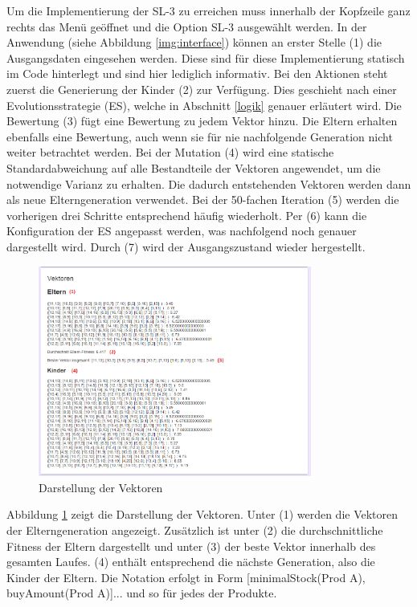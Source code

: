\documentclass[]{scrartcl}
\begin{document}
Um die Implementierung der SL-3 zu erreichen muss innerhalb der Kopfzeile ganz rechts das Menü geöffnet und die Option SL-3 ausgewählt werden. In der Anwendung (siehe Abbildung \ref{img:interface}) können an erster Stelle (1) die Ausgangsdaten eingesehen werden. Diese sind für diese Implementierung statisch im Code hinterlegt und sind hier lediglich informativ. Bei den Aktionen steht zuerst die Generierung der Kinder (2) zur Verfügung. Dies geschieht nach einer Evolutionsstrategie (ES), welche in Abschnitt \ref{logik} genauer erläutert wird. Die Bewertung (3) fügt eine Bewertung zu jedem Vektor hinzu. Die Eltern erhalten ebenfalls eine Bewertung, auch wenn sie für nie nachfolgende Generation nicht weiter betrachtet werden. Bei der Mutation (4) wird eine statische Standardabweichung auf alle Bestandteile der Vektoren angewendet, um die notwendige Varianz zu erhalten. Die dadurch entstehenden Vektoren werden dann als neue Elterngeneration verwendet. Bei der 50-fachen Iteration (5) werden die vorherigen drei Schritte entsprechend häufig wiederholt. Per (6) kann die Konfiguration der ES angepasst werden, was nachfolgend noch genauer dargestellt wird. Durch (7) wird der Ausgangszustand wieder hergestellt.\\

\begin{figure}[htbp]
	\centering
	\includegraphics[width=0.8\textwidth]{res/vektoren.png}
	\caption{Darstellung der Vektoren}
	\label{img:vektoren}
\end{figure}

Abbildung \ref{img:vektoren} zeigt die Darstellung der Vektoren. Unter (1) werden die Vektoren der Elterngeneration angezeigt. Zusätzlich ist unter (2) die durchschnittliche Fitness der Eltern dargestellt und unter (3) der beste Vektor innerhalb des gesamten Laufes. (4) enthält entsprechend die nächste Generation, also die Kinder der Eltern. Die Notation erfolgt in Form [minimalStock(Prod A), buyAmount(Prod A)]... und so für jedes der Produkte.\\
\end{document}
